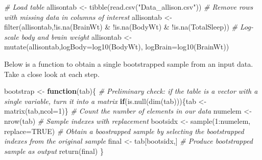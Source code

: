 \documentclass[
]{book}
\newenvironment{Shaded}{\begin{snugshade}}{\end{snugshade}}
\newcommand{\AttributeTok}[1]{\textcolor[rgb]{0.77,0.63,0.00}{#1}}
\newcommand{\CommentTok}[1]{\textcolor[rgb]{0.56,0.35,0.01}{\textit{#1}}}
\newcommand{\ConstantTok}[1]{\textcolor[rgb]{0.00,0.00,0.00}{#1}}
\newcommand{\ControlFlowTok}[1]{\textcolor[rgb]{0.13,0.29,0.53}{\textbf{#1}}}
\newcommand{\DecValTok}[1]{\textcolor[rgb]{0.00,0.00,0.81}{#1}}
\newcommand{\FunctionTok}[1]{\textcolor[rgb]{0.00,0.00,0.00}{#1}}
\newcommand{\NormalTok}[1]{#1}
\newcommand{\OtherTok}[1]{\textcolor[rgb]{0.56,0.35,0.01}{#1}}
\newcommand{\SpecialCharTok}[1]{\textcolor[rgb]{0.00,0.00,0.00}{#1}}
\newcommand{\StringTok}[1]{\textcolor[rgb]{0.31,0.60,0.02}{#1}}
\begin{document}
\begin{Shaded}
\begin{Highlighting}[]
\CommentTok{\# Load table}
\NormalTok{allisontab }\OtherTok{\textless{}{-}} \FunctionTok{tibble}\NormalTok{(}\FunctionTok{read.csv}\NormalTok{(}\StringTok{"Data\_allison.csv"}\NormalTok{))}
\CommentTok{\# Remove rows with missing data in columns of interest }
\NormalTok{allisontab }\OtherTok{\textless{}{-}} \FunctionTok{filter}\NormalTok{(allisontab,}\SpecialCharTok{!}\FunctionTok{is.na}\NormalTok{(BrainWt) }\SpecialCharTok{\&} \SpecialCharTok{!}\FunctionTok{is.na}\NormalTok{(BodyWt) }\SpecialCharTok{\&} \SpecialCharTok{!}\FunctionTok{is.na}\NormalTok{(TotalSleep))}
\CommentTok{\# Log{-}scale body and brain weight}
\NormalTok{allisontab }\OtherTok{\textless{}{-}} \FunctionTok{mutate}\NormalTok{(allisontab,}\AttributeTok{logBody=}\FunctionTok{log10}\NormalTok{(BodyWt), }\AttributeTok{logBrain=}\FunctionTok{log10}\NormalTok{(BrainWt))}
\end{Highlighting}
\end{Shaded}

Below is a function to obtain a single bootstrapped sample from an input data. Take a close look at each step.

\begin{Shaded}
\begin{Highlighting}[]
\NormalTok{bootstrap }\OtherTok{\textless{}{-}} \ControlFlowTok{function}\NormalTok{(tab)\{}
  \CommentTok{\# Preliminary check: if the table is a vector with a single variable, turn it into a matrix}
  \ControlFlowTok{if}\NormalTok{(}\FunctionTok{is.null}\NormalTok{(}\FunctionTok{dim}\NormalTok{(tab)))\{tab }\OtherTok{\textless{}{-}} \FunctionTok{matrix}\NormalTok{(tab,}\AttributeTok{ncol=}\DecValTok{1}\NormalTok{)\}}
  \CommentTok{\# Count the number of elements in our data}
\NormalTok{  numelem }\OtherTok{\textless{}{-}} \FunctionTok{nrow}\NormalTok{(tab)}
  \CommentTok{\# Sample indexes with replacement}
\NormalTok{  bootsidx }\OtherTok{\textless{}{-}} \FunctionTok{sample}\NormalTok{(}\DecValTok{1}\SpecialCharTok{:}\NormalTok{numelem, }\AttributeTok{replace=}\ConstantTok{TRUE}\NormalTok{)}
  \CommentTok{\# Obtain a boostrapped sample by selecting the bootstrapped indexes from the original sample}
\NormalTok{  final }\OtherTok{\textless{}{-}}\NormalTok{ tab[bootsidx,]}
  \CommentTok{\# Produce bootstrapped sample as output}
  \FunctionTok{return}\NormalTok{(final)}
\NormalTok{\}}
\end{Highlighting}
\end{Shaded}
\end{document}
